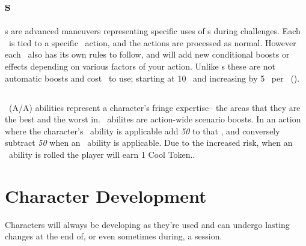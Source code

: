 \section{\techn s\index{\techn}}\label{sec:techniques}
\techn s are advanced maneuvers representing specific uses of \attribute s during challenges. Each \techn\ is tied to a specific \attribute\ action, and the actions are processed as normal. However each \techn\ also has its own rules to follow, and will add new conditional boosts or effects depending on various factors of your action. Unlike \skill s these are not automatic boosts and cost \ENful\ to use; starting at 10 \EN\ and increasing by 5 \EN\ per \advancement\ (\advanmini). 


\section{\AWEAWF{}}\label{sec:aweawf}
\AWEAWF\ (A/A) abilities represent a character's fringe expertise-- the areas that they are the best and the worst in. \AWEAWF\ abilites are action-wide scenario boosts. In an action where the character's \AWE\ ability is applicable add \emph{50} to that \attribute , and conversely subtract \emph{50} when an \AWF\ ability is applicable. Due to the increased risk, when an \AWF\ ability is rolled the player will earn 1 Cool Token.. 



\chapter{Character Development}\label{ch:char_develop}
Characters will always be developing as they're used and can undergo lasting changes at the end of, or even sometimes during, a session.

